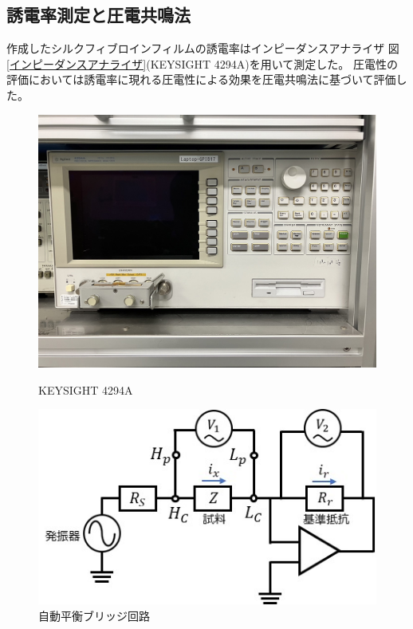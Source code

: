 \documentclass[dvipdfmx,12pt,a4paper]{jreport}
\begin{document}
			\subsection{誘電率測定と圧電共鳴法}
			作成したシルクフィブロインフィルムの誘電率はインピーダンスアナライザ
			図\ref{インピーダンスアナライザ}(KEYSIGHT 4294A)を用いて測定した。
			圧電性の評価においては誘電率に現れる圧電性による効果を圧電共鳴法に基づいて評価した。
			\begin{figure}[h]
				\centering
				\begin{minipage}{0.45\hsize}
					\centering
					\includegraphics[width=\linewidth]{4294A.jpg}
					\caption{KEYSIGHT 4294A}
					\label{インピーダンスアナライザ}
				\end{minipage}
				\begin{minipage}{0.45\hsize}
					\centering
					\includegraphics{自動平衡ブリッジ回路.jpg}
					\caption{自動平衡ブリッジ回路}
					\label{自動平衡ブリッジ回路}
				\end{minipage}
			\end{figure}
\end{document}
